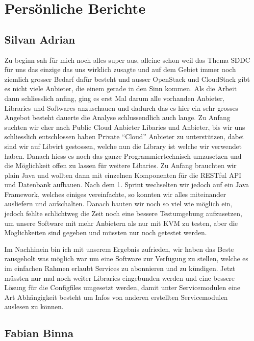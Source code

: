 \chapter{Persönliche Berichte}

\section{Silvan Adrian}


Zu beginn sah für mich noch alles super aus, alleine schon weil das Thema SDDC für 
uns das einzige das uns wirklich zusagte und auf dem Gebiet immer noch ziemlich 
grosser Bedarf dafür besteht und ausser OpenStack und CloudStack gibt es nicht 
viele Anbieter, die einem gerade in den Sinn kommen.
Als die Arbeit dann schliesslich anfing, ging es erst Mal darum alle vorhanden 
Anbieter, Libraries und Softwares anzuschauen und dadurch das es hier ein sehr 
grosses Angebot besteht dauerte die Analyse schlussendlich auch lange.
Zu Anfang suchten wir eher nach Public Cloud Anbieter Libaries und Anbieter, bis 
wir uns schliesslich entschlossen haben Private ``Cloud'' Anbieter zu 
unterstützen, dabei sind wir auf Libvirt gestossen, welche nun die Library ist 
welche wir verwendet haben.
Danach hiess es noch das ganze Programmiertechnisch umzusetzen und die 
Möglichkeit offen zu lassen für weitere Libaries.
Zu Anfang brauchten wir plain Java und wollten dann mit einzelnen Komponenten für die 
RESTful API und Datenbank aufbauen.
Nach dem 1. Sprint wechselten wir jedoch auf ein Java Framework, welches einiges 
vereinfachte, so konnten wir alles miteinander ausliefern und aufschalten.
Danach bauten wir noch so viel wie möglich ein, jedoch fehlte schlichtweg die 
Zeit noch eine bessere Testumgebung aufzusetzen, um unsere Software mit mehr 
Anbietern als nur mit KVM zu testen, aber die Möglichkeiten sind gegeben und 
müssten nur noch getestet werden.

Im Nachhinein bin ich mit unserem Ergebnis zufrieden, wir haben das Beste 
rausgeholt was möglich war um eine Software zur Verfügung zu stellen, welche es 
im einfachen Rahmen erlaubt Services zu abonnieren und zu kündigen.
Jetzt müssten nur mal noch weiter Libraries eingebunden werden und eine bessere 
Lösung für die Configfiles umgesetzt werden, damit unter Servicemodulen eine Art 
Abhängigkeit besteht um Infos von anderen erstellten Servicemodulen auslesen zu 
können.


\section{Fabian Binna}